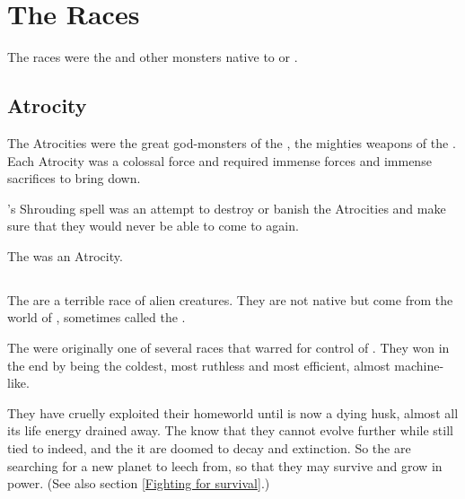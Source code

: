 \chapter{The \Erebean Races}
The \Erebean{} races were the \banes{} and other monsters native to \Erebos{} or \Nyx. 















\section{Atrocity}
The Atrocities were the great god-monsters of the \banes, the mighties weapons of the \SitraAchras. 
Each Atrocity was a colossal force and required immense forces and immense sacrifices to bring down. 

\Iscrafel's Shrouding spell was an attempt to destroy or banish the Atrocities and make sure that they would never be able to come to \Miith again. 

The  was an Atrocity.















\section{\Bane}
\index{\banes}
The \banes{} are a terrible race of alien creatures. They are not native \Miith{} but come from the world of \Erebos, sometimes called the \Baneworld. 

The \banes{} were originally one of several races that warred for control of \Erebos. They won in the end by being the coldest, most ruthless and most efficient, almost machine-like. 

They have cruelly exploited their homeworld until \Erebos{} is now a dying husk, almost all its life energy drained away. The \banes{} know that they cannot evolve further while still tied to \Erebos\dash indeed, \Erebos{} and the \banes{} it are doomed to decay and extinction. So the \banes{} are searching for a new planet to leech from, so that they may survive and grow in power. (See also section \ref{Fighting for survival}.)

